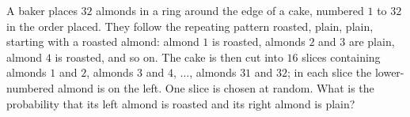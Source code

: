 A baker places $32$ almonds in a ring around the edge of a cake, numbered $1$ to $32$ in the order placed. They follow the repeating pattern roasted, plain, plain, starting with a roasted almond: almond $1$ is roasted, almonds $2$ and $3$ are plain, almond $4$ is roasted, and so on. The cake is then cut into $16$ slices containing almonds $1$ and $2$, almonds $3$ and $4$, $\dots$, almonds $31$ and $32$; in each slice the lower-numbered almond is on the left. One slice is chosen at random. What is the probability that its left almond is roasted and its right almond is plain?
